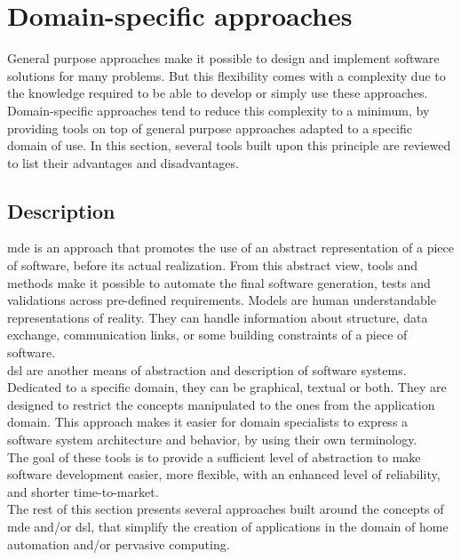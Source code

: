 \newpage
\section{Domain-specific approaches}
\label{sec:domainSpecificApproaches}

General purpose approaches make it possible to design and implement software solutions for many problems. But this flexibility comes with a complexity due to the knowledge required to be able to develop or simply use these approaches.\\

Domain-specific approaches tend to reduce this complexity to a minimum, by providing tools on top of general purpose approaches adapted to a specific domain of use. In this section, several tools built upon this principle are reviewed to list their advantages and disadvantages.

\subsection{Description}
\label{sec:mdeEtDSL}


\gls{mde} is an approach that promotes the use of an abstract representation of a piece of software, before its actual realization. From this abstract view, tools and methods make it possible to automate the final software generation, tests and validations across pre-defined requirements. Models are human understandable representations of reality. They can handle information about structure, data exchange, communication links, or some building constraints of a piece of software.\\
\gls{dsl} are another means of abstraction and description of software systems. Dedicated to a specific domain, they can be graphical, textual or both. They are designed to restrict the concepts manipulated to the ones from the application domain. This approach makes it easier for domain specialists to express a software system architecture and behavior, by using their own terminology.\\

The goal of these tools is to provide a sufficient level of abstraction to make software development easier, more flexible, with an enhanced level of reliability, and shorter time-to-market.\\
The rest of this section presents several approaches built around the concepts of \gls{mde} and/or \gls{dsl}, that simplify the creation of applications in the domain of home automation and/or pervasive computing.\\


